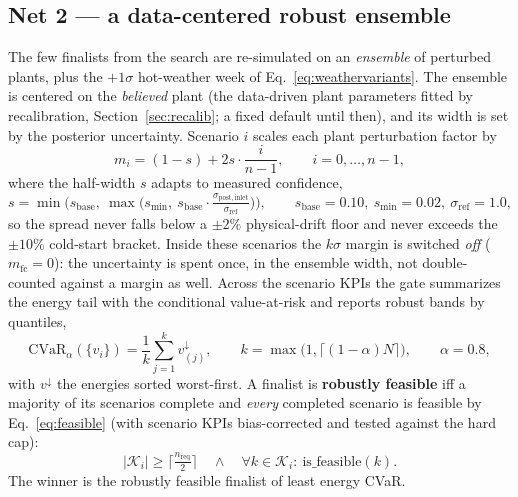 \documentclass[11pt]{article}
\begin{document}
\subsection{Net 2 --- a data-centered robust ensemble}
The few finalists from the search are re-simulated on an \emph{ensemble} of perturbed
plants, plus the \(+1\sigma\) hot-weather week of Eq.~\eqref{eq:weathervariants}. The
ensemble is centered on the \emph{believed} plant (the data-driven plant parameters fitted
by recalibration, Section~\ref{sec:recalib}; a fixed default until then), and its width is
set by the posterior uncertainty. Scenario \(i\) scales each plant perturbation factor by
\begin{equation}
m_i = (1-s) + 2s\cdot\frac{i}{n-1},\qquad i=0,\dots,n-1,
\label{eq:multipliers}
\end{equation}
where the half-width \(s\) adapts to measured confidence,
\begin{equation}
s = \min\!\Big(s_{\mathrm{base}},\ \max\!\big(s_{\min},\ s_{\mathrm{base}}\cdot \tfrac{\sigma_{\mathrm{post,inlet}}}{\sigma_{\mathrm{ref}}}\big)\Big),
\qquad s_{\mathrm{base}}=0.10,\ s_{\min}=0.02,\ \sigma_{\mathrm{ref}}=1.0,
\label{eq:halfwidth}
\end{equation}
so the spread never falls below a \(\pm 2\%\) physical-drift floor and never exceeds the
\(\pm 10\%\) cold-start bracket. Inside these scenarios the \(k\sigma\) margin is switched
\emph{off} (\(m_{\mathrm{fc}}=0\)): the uncertainty is spent once, in the ensemble width,
not double-counted against a margin as well. Across the scenario KPIs the gate summarizes
the energy tail with the conditional value-at-risk and reports robust bands by quantiles,
\begin{equation}
\mathrm{CVaR}_\alpha(\{v_i\}) = \frac{1}{k}\sum_{j=1}^{k} v^{\downarrow}_{(j)},
\qquad k = \max\!\big(1, \lceil (1-\alpha) N\rceil\big),
\qquad \alpha = 0.8,
\label{eq:cvar}
\end{equation}
with \(v^{\downarrow}\) the energies sorted worst-first. A finalist is \textbf{robustly
feasible} iff a majority of its scenarios complete and \emph{every} completed scenario is
feasible by Eq.~\eqref{eq:feasible} (with scenario KPIs bias-corrected and tested against
the hard cap):
\begin{equation}
\lvert\mathcal{K}_i\rvert \ge \Big\lceil \tfrac{n_{\mathrm{req}}}{2}\Big\rceil
\quad\wedge\quad
\forall k\in\mathcal{K}_i:\ \mathrm{is\_feasible}(k).
\label{eq:robustfeas}
\end{equation}
The winner is the robustly feasible finalist of least energy CVaR.
\end{document}
